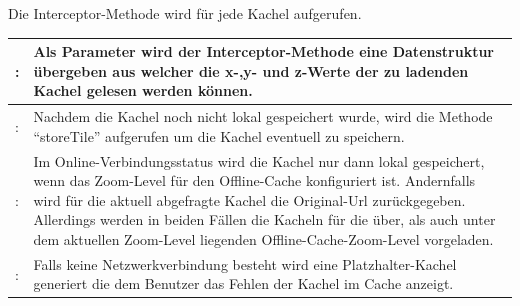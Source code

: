 Die Interceptor-Methode wird für jede Kachel aufgerufen.\\
\begin{table}[H]
  \begin{tabulary}{\columnwidth}{>{\raggedleft}m{.5cm} L}
  : & Als Parameter wird der Interceptor-Methode eine Datenstruktur übergeben aus welcher die x-,y- und z-Werte der zu ladenden Kachel gelesen werden können. \\ : & Nachdem die Kachel noch nicht lokal gespeichert wurde, wird die Methode "`storeTile"' aufgerufen um die Kachel eventuell zu speichern. \\ : & Im Online-Verbindungsstatus wird die Kachel nur dann lokal gespeichert, wenn das Zoom-Level für den Offline-Cache konfiguriert ist. Andernfalls wird für die aktuell abgefragte Kachel die Original-Url zurückgegeben. Allerdings werden in beiden Fällen die Kacheln für die über, als auch unter dem aktuellen Zoom-Level liegenden Offline-Cache-Zoom-Level vorgeladen. \\ : & Falls keine Netzwerkverbindung besteht wird eine Platzhalter-Kachel generiert die dem Benutzer das Fehlen der Kachel im Cache anzeigt. \\ \hline
  \end{tabulary}
\end{table}
\enlargethispage{2\baselineskip} %

